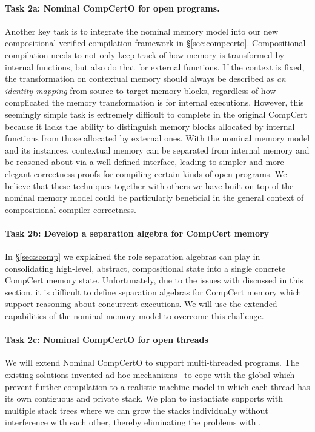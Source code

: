 \paragraph*{Task 2a: Nominal CompCertO for open programs.}
Another key task is to integrate the nominal memory model into our
new compositional verified compilation framework in
\S\ref{sec:compcerto}.  Compositional compilation needs to not only
keep track of how memory is transformed by internal functions, but
also do that for external functions.  If the context is fixed, the
transformation on contextual memory should always be described as
\emph{an identity mapping} from source to target memory blocks,
regardless of how complicated the memory transformation is for
internal executions.  However, this seemingly simple task is extremely
difficult to complete in the original CompCert because it lacks the
ability to distinguish memory blocks allocated by internal functions
from those allocated by external ones. With the nominal memory model and its
instances, contextual memory can be separated from internal memory and
be reasoned about via a well-defined interface, leading to simpler and
more elegant correctness proofs for compiling certain kinds of open
programs. We believe that these techniques together with others we
have built on top of the nominal memory model could be particularly
beneficial in the general context of compositional compiler
correctness.

\vspace*{-2ex}
\paragraph*{Task 2b: Develop a separation algebra for CompCert memory}
In \S\ref{sec:scomp}
we explained the role separation algebras can play
in consolidating high-level, abstract, compositional state
into a single concrete CompCert memory state.
%
Unfortunately,
due to the issues with \nextblock
discussed in this section,
it is difficult to define separation algebras
for CompCert memory
which support reasoning about concurrent executions.
We will use the extended capabilities of
the nominal memory model
to overcome this challenge.

\vspace*{-2ex}
\paragraph*{Task 2c: Nominal CompCertO for open threads}
We will extend Nominal CompCertO to support
multi-threaded programs. The existing solutions invented ad hoc
mechanisms~\cite{ccal18} to cope with the global \nextblock which
prevent further compilation to a realistic machine model in which each
thread has its own contiguous and private stack. We plan to
instantiate supports with multiple stack trees where we can grow
the stacks individually without interference with each other, thereby
eliminating the problems with \nextblock.



